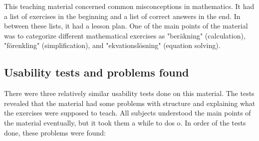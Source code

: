 This teaching material concerned common misconceptions in mathematics. It had a list of exercises in the beginning and a list of correct answers in the end. In between these lists, it had a lesson plan. One of the main points of the material was to categorize different mathematical exercises as "beräkning" (calculation), "förenkling" (simplification), and "ekvationslösning" (equation solving).


\subsection{Usability tests and problems found}

There were three relatively similar usability tests done on this material. The tests revealed that the material had some problems with structure and explaining what the exercises were supposed to teach. All subjects understood the main points of the material eventually, but it took them a while to dos o. In order of the tests done, these problems were found:

